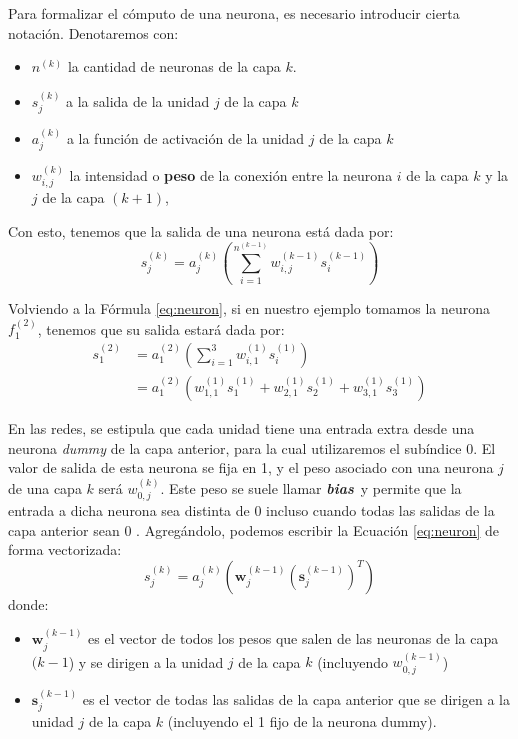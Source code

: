 \documentclass[../../main.tex]{subfiles}
\begin{document}
Para formalizar el cómputo de una neurona, es necesario introducir cierta notación.
Denotaremos con:
\begin{itemize}[itemsep=0.1cm]
    \item \(n^{(k)}\) la cantidad de neuronas de la capa \(k\).
    \item \(s^{(k)}_j\) a la salida de la unidad \(j\) de la capa \(k\)
    \item \(a^{(k)}_j\) a la función de activación de la unidad \(j\) de la capa \(k\)
    \item \(w^{(k)}_{i,j}\) la intensidad o \textbf{peso} de la conexión entre la
    neurona \(i\) de la capa \(k\) y la \(j\) de la capa \((k+1)\),
\end{itemize}
Con esto, tenemos que la salida de una neurona está dada por:
\begin{equation}
    s^{(k)}_j = a^{(k)}_j \left( \sum_{i=1}^{n^{(k-1)}} w^{(k-1)}_{i,j} s^{(k-1)}_i \right)
    \label{eq:neuron}
\end{equation}

Volviendo a la Fórmula \ref{eq:neuron}, si en nuestro ejemplo tomamos la neurona
\(f^{(2)}_1\), tenemos que su salida estará dada por:
\begin{align*}
    s^{(2)}_1 &= a^{(2)}_1 \left( \sum_{i=1}^{3} w^{(1)}_{i,1} s^{(1)}_i \right) \\
              &= a^{(2)}_1 \left( w^{(1)}_{1,1}s^{(1)}_1 +  w^{(1)}_{2,1}s^{(1)}_2 + w^{(1)}_{3,1}s^{(1)}_3 \right)
\end{align*}

En las redes, se estipula que cada unidad tiene una entrada extra desde una neurona
\textit{dummy} de la capa anterior, para la cual utilizaremos el subíndice 0. El valor de
salida de esta neurona se fija en 1, y el peso asociado con una neurona \(j\) de una capa
\(k\) será \(w^{(k)}_{0,j}\). Este peso se suele llamar
\textit{\textbf{bias}}\footnotemark\ y permite que la entrada a dicha neurona sea distinta
de 0 incluso cuando todas las salidas de la capa anterior sean 0
\cite{ai-a-modern-approach}. Agregándolo, podemos escribir la Ecuación \ref{eq:neuron} de
forma vectorizada:
\begin{equation}
    s^{(k)}_j = a^{(k)}_j \left( \bm{w}^{(k-1)}_j \left( \bm{s}^{(k-1)}_j \right)^T \right)
\end{equation}
donde: \vspace{-0.25cm}
\begin{itemize}
    \item \(\bm{w}^{(k-1)}_j\) es el vector de todos los pesos que salen de las neuronas de la
    capa \((k-1\)) y se dirigen a la unidad \(j\) de la capa \(k\) (incluyendo \(w^{(k-1)}_{0,j}\))
    \item \(\bm{s}^{(k-1)}_j\) es el vector de todas las salidas de la capa anterior que se
dirigen a la unidad \(j\) de la capa \(k\) (incluyendo el 1 fijo de la neurona dummy).
\end{itemize}
\end{document}
